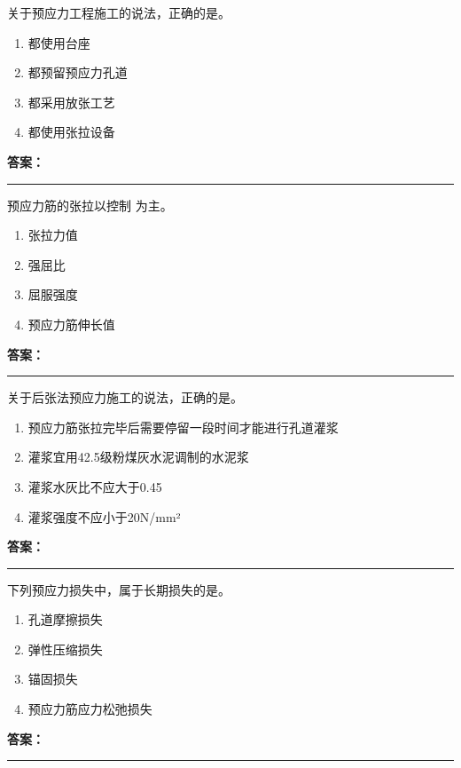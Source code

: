 \documentclass[UTF8,fontset=fandol,11pt]{ctexart}
\newcommand{\answerline}{\textcolor{answerred}{\rule{2.4cm}{0.7pt}}}
\begin{document}
\begin{quizbox}[title={第 3 题}]
关于预应力工程施工的说法，正确的是。\\
\begin{enumerate}[label=\Alph*.]
\item 都使用台座
\item 都预留预应力孔道
\item 都采用放张工艺
\item 都使用张拉设备
\end{enumerate}
\textbf{\textcolor{answerred}{答案：}} \answerline
\end{quizbox}

\begin{quizbox}[title={第 4 题}]
预应力筋的张拉以控制 为主。\\
\begin{enumerate}[label=\Alph*.]
\item 张拉力值
\item 强屈比
\item 屈服强度
\item 预应力筋伸长值
\end{enumerate}
\textbf{\textcolor{answerred}{答案：}} \answerline
\end{quizbox}

\begin{quizbox}[title={第 5 题}]
关于后张法预应力施工的说法，正确的是。\\
\begin{enumerate}[label=\Alph*.]
\item 预应力筋张拉完毕后需要停留一段时间才能进行孔道灌浆
\item 灌浆宜用42.5级粉煤灰水泥调制的水泥浆
\item 灌浆水灰比不应大于0.45
\item 灌浆强度不应小于20N/mm²
\end{enumerate}
\textbf{\textcolor{answerred}{答案：}} \answerline
\end{quizbox}

\begin{quizbox}[title={第 6 题}]
下列预应力损失中，属于长期损失的是。\\
\begin{enumerate}[label=\Alph*.]
\item 孔道摩擦损失
\item 弹性压缩损失
\item 锚固损失
\item 预应力筋应力松弛损失
\end{enumerate}
\textbf{\textcolor{answerred}{答案：}} \answerline
\end{quizbox}
\end{document}
